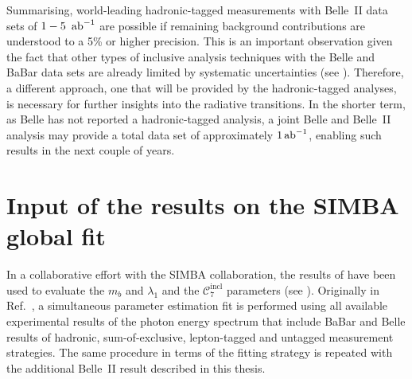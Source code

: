 Summarising, world-leading hadronic-tagged \BtoXsgamma measurements with Belle~II data sets of $1-5~\mbox{\,ab}^{-1}$ are possible if remaining background contributions are understood to a 5\% or higher precision.
This is an important observation given the fact that other types of inclusive \BtoXsgamma analysis techniques with the Belle and BaBar data sets are already limited by systematic uncertainties (see ).
Therefore, a different approach, one that will be provided by the hadronic-tagged analyses, is necessary for further insights into the radiative \BtoXsgamma transitions.
In the shorter term, as Belle has not reported a hadronic-tagged \BtoXsgamma analysis, a joint Belle and Belle~II analysis may provide a total data set of approximately $1\mbox{\,ab}^{-1}$, enabling such results in the next couple of years.

\section{Input of the results on the SIMBA global fit}\label{sec:input_to_theory}

In a collaborative effort with the SIMBA collaboration, the results of 
have been used to evaluate the $m_b$ and $\lambda_1$ and the $\mathcal{C}_7^{\mathrm{incl}}$ parameters (see ). 
Originally in Ref.~\cite{Bernlochner:2020jlt}, a simultaneous parameter estimation fit is performed using all available experimental results of the photon energy spectrum that include
BaBar and Belle results of hadronic, sum-of-exclusive, lepton-tagged and untagged measurement strategies.
The same procedure in terms of the fitting strategy is repeated with the additional Belle~II result described in this thesis.

